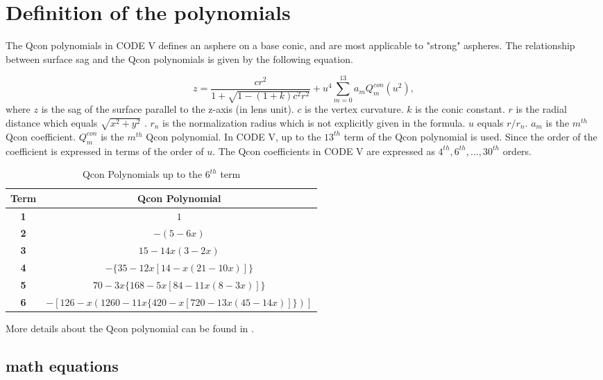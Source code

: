 \chapter{Definition of the polynomials} 
\label{apdx: chapter-5-system-Qcon-polynomial}
\graphicspath{ {./Appendix/figures/} }  %
\captionsetup[figure]{labelfont=bf}
\captionsetup{margin=1.5em}
\captionsetup[table]{labelfont=bf}

The Qcon polynomials in CODE V defines an asphere on a base conic, and are most applicable to "strong" aspheres. The relationship between surface sag and the Qcon polynomials is given by the following equation. 

\begin{equation}\label{apdx: Qcon formular}
z = \frac{c{r^2}}{1+\sqrt{1-(1+k){c^2}{r^2}}} + {u^4}\sum\limits_{m=0}^{13} {a_m}Q_{m}^{con}(u^2),
\end{equation}where $z$ is the sag of the surface parallel to the z-axis (in lens unit). $c$ is the vertex curvature. $k$ is the conic constant. $r$ is the radial distance which equals $\sqrt{x^2+y^2}$ . $r_n$ is the normalization radius which is not explicitly given in the formula. $u$ equals $r/r_n$. $a_m$ is the $m^{th}$ Qcon coefficient. $Q^{con}_m$ is the $m^{th}$ Qcon polynomial. In CODE V, up to the $13^{th}$ term of the Qcon polynomial is used. Since the order of the coefficient is expressed in terms of the order of $u$. The Qcon coefficients in CODE V are expressed as $4^{th}, 6^{th}, ..., 30^{th}$ orders.  

\begin{table}[h!]
    \centering
  \captionsetup{justification=centering}
    \caption{Qcon Polynomials up to the $6^{th}$ term}
    \label{apdx table: Qcon Polynomial terms}
    \vspace{-1em}
    \begin{adjustbox}{max width=\textwidth, center}
    \begin{tabular}{c c }
    \hline 
     \textbf{Term} & \textbf{Qcon Polynomial} \\ 
     \hline
      \textbf{1} & $1$ \\
      \textbf{2} & $-(5-6x)$\\
  	  \textbf{3} & $15-14x(3-2x)$	\\
      \textbf{4} & $-\{35-12x[14-x(21-10x)]\}$\\
      \textbf{5} & $70 - 3x\{168 - 5x[84-11x(8-3x)]\}$\\
      \textbf{6} & $-[126-x(1260-11x\{420-x[720-13x(45-14x)]\})]$\\
    \hline
    \end{tabular}
    \end{adjustbox}
\end{table}

More details about the Qcon polynomial can be found in \cite{ForbesOE07}.

\section{math equations}






